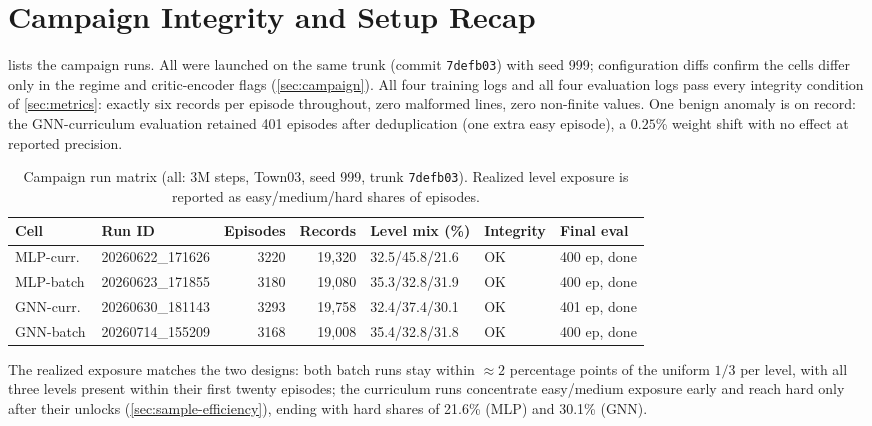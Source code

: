 \section{Campaign Integrity and Setup Recap}
\label{sec:integrity}

 lists the campaign runs. All were launched on the
same trunk (commit \texttt{7defb03}) with seed 999; configuration diffs
confirm the cells differ only in the regime and critic-encoder flags
(\cref{sec:campaign}). All four training logs and all four evaluation
logs pass every integrity condition of \cref{sec:metrics}: exactly six
records per episode throughout, zero malformed lines, zero non-finite
values. One benign anomaly is on record: the GNN-curriculum evaluation
retained 401 episodes after deduplication (one extra easy episode),
a $0.25$\% weight shift with no effect at reported precision.

\begin{table}[t]
  \centering\small
  \caption{Campaign run matrix (all: 3M steps, Town03, seed 999, trunk
  \texttt{7defb03}). Realized level exposure is reported as
  easy/medium/hard shares of episodes.}
  \label{tab:runmatrix}
  \begin{tabular}{@{}llrrlll@{}}
    \toprule
    Cell & Run ID & Episodes & Records & Level mix (\%) & Integrity & Final eval \\
    \midrule
    MLP-curr.\ & 20260622\_171626 & 3220 & 19{,}320 & 32.5/45.8/21.6 & OK & 400 ep, done \\
    MLP-batch  & 20260623\_171855 & 3180 & 19{,}080 & 35.3/32.8/31.9 & OK & 400 ep, done \\
    GNN-curr.\ & 20260630\_181143 & 3293 & 19{,}758 & 32.4/37.4/30.1 & OK & 401 ep, done \\
    GNN-batch  & 20260714\_155209 & 3168 & 19{,}008 & 35.4/32.8/31.8 & OK & 400 ep, done \\
    \bottomrule
  \end{tabular}
\end{table}

The realized exposure matches the two designs: both batch runs stay
within $\approx 2$ percentage points of the uniform $1/3$ per level, with
all three levels present within their first twenty episodes; the
curriculum runs concentrate easy/medium exposure early and reach hard
only after their unlocks (\cref{sec:sample-efficiency}), ending with hard
shares of 21.6\% (MLP) and 30.1\% (GNN).

